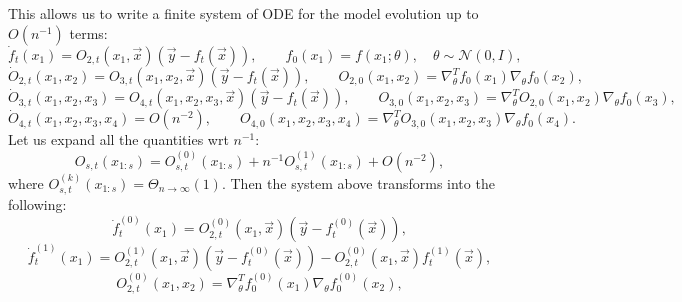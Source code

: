 \documentclass{article}
\newcommand{\NN}{\mathcal{N}}
\begin{document}
    This allows us to write a finite system of ODE for the model evolution up to $O(n^{-1})$ terms: %
    \begin{equation}
        \dot f_{t}(x_1) = 
        O_{2,t}(x_1, \vec x) (\vec y - f_t(\vec x)),
        \qquad
        f_0(x_1) =
        f(x_1; \theta),
        \quad
        \theta \sim
        \NN(0, I),
    \end{equation}
    \begin{equation}
        \dot O_{2,t}(x_1, x_2) = 
        O_{3,t}(x_1, x_2, \vec x) (\vec y - f_t(\vec x)),
        \qquad
        O_{2,0}(x_1, x_2) =
        \nabla_\theta^T f_0(x_1) \nabla_\theta f_0(x_2),
    \end{equation}
    \begin{equation}
        \dot O_{3,t}(x_1, x_2, x_3) = 
        O_{4,t}(x_1, x_2, x_3, \vec x) (\vec y - f_t(\vec x)),
        \qquad
        O_{3,0}(x_1, x_2, x_3) =
        \nabla_\theta^T O_{2,0}(x_1, x_2) \nabla_\theta f_0(x_3),
    \end{equation}
    \begin{equation}
        \dot O_{4,t}(x_1, x_2, x_3, x_4) = 
        O(n^{-2}),
        \qquad
        O_{4,0}(x_1, x_2, x_3, x_4) =
        \nabla_\theta^T O_{3,0}(x_1, x_2, x_3) \nabla_\theta f_0(x_4).
    \end{equation}
    Let us expand all the quantities wrt $n^{-1}$:
    \begin{equation}
        O_{s,t}(x_{1:s}) =
        O_{s,t}^{(0)}(x_{1:s}) + n^{-1} O_{s,t}^{(1)}(x_{1:s}) + O(n^{-2}),
    \end{equation}
    where $O_{s,t}^{(k)}(x_{1:s}) = \Theta_{n\to\infty}(1)$.
    Then the system above transforms into the following:
    \begin{equation}
        \dot f_{t}^{(0)}(x_1) = 
        O_{2,t}^{(0)}(x_1, \vec x) (\vec y - f_t^{(0)}(\vec x)),
    \end{equation}
    \begin{equation}
        \dot f_{t}^{(1)}(x_1) = 
        O_{2,t}^{(1)}(x_1, \vec x) (\vec y - f_t^{(0)}(\vec x)) - O_{2,t}^{(0)}(x_1, \vec x) f_t^{(1)}(\vec x),
    \end{equation}
    \begin{equation}
        O_{2,t}^{(0)}(x_1, x_2) =
        \nabla_\theta^T f_0^{(0)}(x_1) \nabla_\theta f_0^{(0)}(x_2),
    \end{equation}
\end{document}

